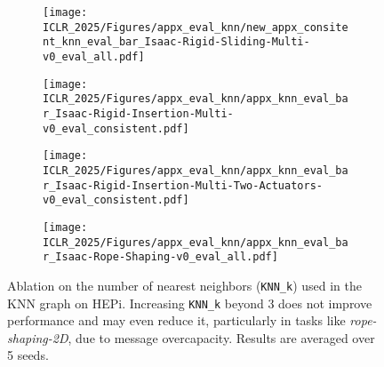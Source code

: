 \begin{figure*}[htb]
    \centering
    \begin{subfigure}[b]{0.24\linewidth}
        \texttt{[image: ICLR\_2025/Figures/appx\_eval\_knn/new\_appx\_consitent\_knn\_eval\_bar\_Isaac-Rigid-Sliding-Multi-v0\_eval\_all.pdf]}
    \end{subfigure}
    \hfill
    \begin{subfigure}[b]{0.24\linewidth}
        \texttt{[image: ICLR\_2025/Figures/appx\_eval\_knn/appx\_knn\_eval\_bar\_Isaac-Rigid-Insertion-Multi-v0\_eval\_consistent.pdf]}
    \end{subfigure}
    \hfill
    \begin{subfigure}[b]{0.24\linewidth}
        \texttt{[image: ICLR\_2025/Figures/appx\_eval\_knn/appx\_knn\_eval\_bar\_Isaac-Rigid-Insertion-Multi-Two-Actuators-v0\_eval\_consistent.pdf]}
    \end{subfigure}
    \hfill
    \begin{subfigure}[b]{0.24\linewidth}
        \texttt{[image: ICLR\_2025/Figures/appx\_eval\_knn/appx\_knn\_eval\_bar\_Isaac-Rope-Shaping-v0\_eval\_all.pdf]}
    \end{subfigure}
    \caption{Ablation on the number of nearest neighbors (\texttt{KNN\_k}) used in the KNN graph on HEPi. Increasing \texttt{KNN\_k} beyond 3 does not improve performance and may even reduce it, particularly in tasks like \textit{rope-shaping-2D}, due to message overcapacity. Results are averaged over 5 seeds.}

    \vspace{-0.2cm}
    \label{fig:appx_knn_k}
\end{figure*}
